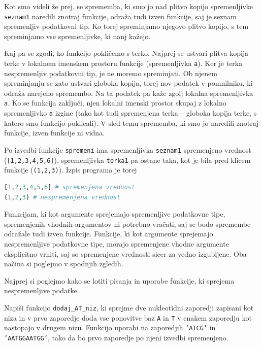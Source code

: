 \begin{resitev}
Kot smo videli že prej, se sprememba, ki smo jo nad plitvo kopijo spremenljivke \texttt{seznam1} naredili znotraj funkcije, odraža tudi izven funkcije, saj je seznam spremenljiv podatkovni tip. Ko torej spreminjamo njegovo plitvo kopijo, s tem spreminjamo vse spremenljivke, ki nanj kažejo. 

Kaj pa se zgodi, ko funkcijo pokličemo s terko. Najprej se ustvari plitva kopija terke v lokalnem imenskem prostoru funkcije (spremenljivka \texttt{a}). Ker je terka nespremenljiv podatkovni tip, je ne moremo spreminjati. Ob njenem spreminjanju se zato ustvari globoka kopija, torej nov podatek v pomnilniku, ki odraža narejeno spremembo. Na ta podatek pa kaže zgolj lokalna spremenljivka \texttt{a}. Ko se funkcija zaključi, njen lokalni imenski prostor skupaj z lokalno spremenljivko \texttt{a} izgine (tako kot tudi spremenjena terka -- globoka kopija terke, s katero smo funkcijo poklicali). V sled temu sprememba, ki smo jo naredili znotraj funkcije, izven funkcije ni vidna.

Po izvedbi funkcije \texttt{spremeni} ima spremenljivka \texttt{seznam1} spremenjeno vrednost (\texttt{[1,2,3,4,5,6]}), spremenljivka \texttt{terka1} pa ostane taka, kot je bila pred klicem funkcije (\texttt{(1,2,3)}). Izpis programa je torej
\begin{lstlisting}[language=Python]
[1,2,3,4,5,6] # spremenjena vrednost
(1,2,3) # nespremenjena vrednost
\end{lstlisting}

\end{resitev}

Funkcijam, ki kot argumente sprejemajo spremenljive podatkovne tipe, spremenjenih vhodnih argumentov ni potrebno vračati, saj se bodo spremembe odražale tudi izven funkcije. Funkcije, ki kot argumente sprejemajo nespremenljive podatkovne tipe, morajo spremenjene vhodne argumente eksplicitno vrniti, saj so spremenjene vrednosti sicer za vedno izgubljene. Oba načina si poglejmo v spodnjih zgledih.

Najprej si poglejmo kako se lotiti pisanja in uporabe funkcije, ki sprejema nespremenljive podatke.
\begin{zgled}
Napiši funkcijo \texttt{dodaj\_AT\_niz}, ki sprejme dve nukleotidni zaporedji zapisani kot niza in v prvo zaporedje doda vse ponovitve baz \texttt{A} in \texttt{T} v enakem zaporedju kot nastopajo v drugem nizu. Funkcijo uporabi na zaporedjih \texttt{'ATCG'} in \texttt{'AATGGAATGG'}, tako da bo prvo zaporedje po njeni izvedbi spremenjeno.
\end{zgled}

